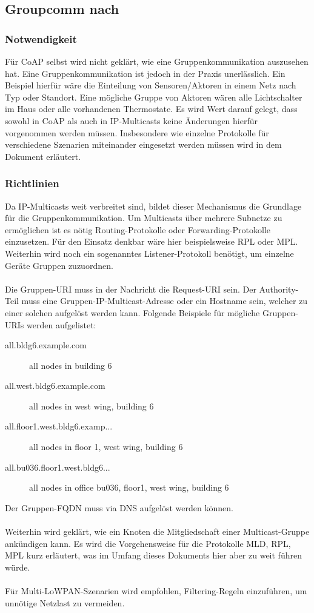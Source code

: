 \subsection{Groupcomm nach \cite{draft-ietf-core-groupcomm-05}}
\subsubsection{Notwendigkeit}
Für \ac{CoAP} selbst wird nicht geklärt, wie eine Gruppenkommunikation auszusehen hat.
Eine Gruppenkommunikation ist jedoch in der Praxis unerlässlich.
Ein Beispiel hierfür wäre die Einteilung von Sensoren/Aktoren in einem Netz nach Typ oder Standort.
Eine mögliche Gruppe von Aktoren wären alle Lichtschalter im Haus oder alle vorhandenen
Thermostate.
Es wird Wert darauf gelegt, dass sowohl in \ac{CoAP} als auch in \ac{IP}-Multicasts keine
Änderungen hierfür vorgenommen werden müssen.
Insbesondere wie einzelne Protokolle für verschiedene Szenarien miteinander eingesetzt werden
müssen wird in dem Dokument erläutert.
\subsubsection{Richtlinien}
Da \ac{IP}-Multicasts weit verbreitet sind, bildet dieser Mechanismus die Grundlage für die
Gruppenkommunikation.
Um Multicasts über mehrere Subnetze zu ermöglichen ist es nötig Routing-Protokolle oder
Forwarding-Protokolle einzusetzen.
Für den Einsatz denkbar wäre hier beispielsweise \ac{RPL} oder \ac{MPL}.
Weiterhin wird noch ein sogenanntes Listener-Protokoll benötigt, um einzelne Geräte Gruppen
zuzuordnen.\\\\
Die Gruppen-\ac{URI} muss in der Nachricht die Request-\ac{URI} sein.
Der Authority-Teil muss eine Gruppen-\ac{IP}-Multicast-Adresse oder ein Hostname sein, welcher zu einer
solchen aufgelöst werden kann.
Folgende Beispiele für mögliche Gruppen-\ac{URI}s werden aufgelistet:
\begin{description}
\item[all.bldg6.example.com] all nodes in building 6
\item[all.west.bldg6.example.com] all nodes in west wing, building 6
\item[all.floor1.west.bldg6.examp...] all nodes in floor 1, west wing, building 6
\item[all.bu036.floor1.west.bldg6...] all nodes in office bu036, floor1, west wing, building 6
\end{description}
Der Gruppen-\ac{FQDN} muss via \ac{DNS} aufgelöst werden können.\\\\
Weiterhin wird geklärt, wie ein Knoten die Mitgliedschaft einer Multicast-Gruppe ankündigen kann.
Es wird die Vorgehensweise für die Protokolle \ac{MLD}, \ac{RPL}, \ac{MPL} kurz erläutert, was im
Umfang dieses Dokuments hier aber zu weit führen würde.\\\\
Für Multi-LoWPAN-Szenarien wird empfohlen, Filtering-Regeln einzuführen, um unnötige Netzlast zu
vermeiden. 

